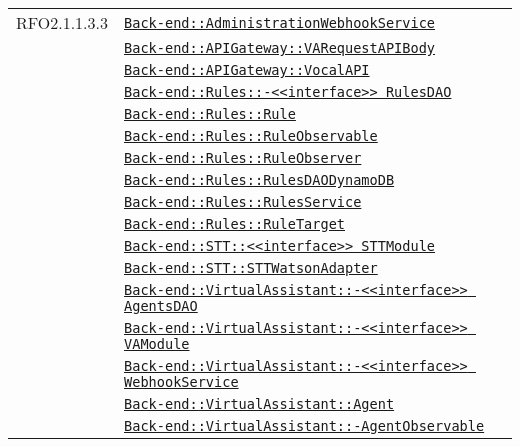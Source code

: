 \begin{longtable}{|>{\centering}m{3cm}|m{10cm}<{\centering}|}
RFO2.1.1.3.3 & \hyperref[Back-end::AdministrationWebhookService]{\texttt{Back-end::AdministrationWebhookService}}\\
& \hyperref[Back-end::APIGateway::VARequestAPIBody]{\texttt{Back-end::APIGateway::VARequestAPIBody}}\\
& \hyperref[Back-end::APIGateway::VocalAPI]{\texttt{Back-end::APIGateway::VocalAPI}}\\
& \hyperref[Back-end::Rules::<<interface>> RulesDAO]{\texttt{Back-end::Rules::-\linebreak <<interface>> RulesDAO}}\\
& \hyperref[Back-end::Rules::Rule]{\texttt{Back-end::Rules::Rule}}\\
& \hyperref[Back-end::Rules::RuleObservable]{\texttt{Back-end::Rules::RuleObservable}}\\
& \hyperref[Back-end::Rules::RuleObserver]{\texttt{Back-end::Rules::RuleObserver}}\\
& \hyperref[Back-end::Rules::RulesDAODynamoDB]{\texttt{Back-end::Rules::RulesDAODynamoDB}}\\
& \hyperref[Back-end::Rules::RulesService]{\texttt{Back-end::Rules::RulesService}}\\
& \hyperref[Back-end::Rules::RuleTarget]{\texttt{Back-end::Rules::RuleTarget}}\\
& \hyperref[Back-end::STT::<<interface>> STTModule]{\texttt{Back-end::STT::<<interface>> STTModule}}\\
& \hyperref[Back-end::STT::STTWatsonAdapter]{\texttt{Back-end::STT::STTWatsonAdapter}}\\
& \hyperref[Back-end::VirtualAssistant::<<interface>> AgentsDAO]{\texttt{Back-end::VirtualAssistant::-\linebreak <<interface>> AgentsDAO}}\\
& \hyperref[Back-end::VirtualAssistant::<<interface>> VAModule]{\texttt{Back-end::VirtualAssistant::-\linebreak <<interface>> VAModule}}\\
& \hyperref[Back-end::VirtualAssistant::<<interface>> WebhookService]{\texttt{Back-end::VirtualAssistant::-\linebreak <<interface>> WebhookService}}\\
& \hyperref[Back-end::VirtualAssistant::Agent]{\texttt{Back-end::VirtualAssistant::Agent}}\\
& \hyperref[Back-end::VirtualAssistant::AgentObservable]{\texttt{Back-end::VirtualAssistant::-\linebreak AgentObservable}}\\

\end{longtable}
